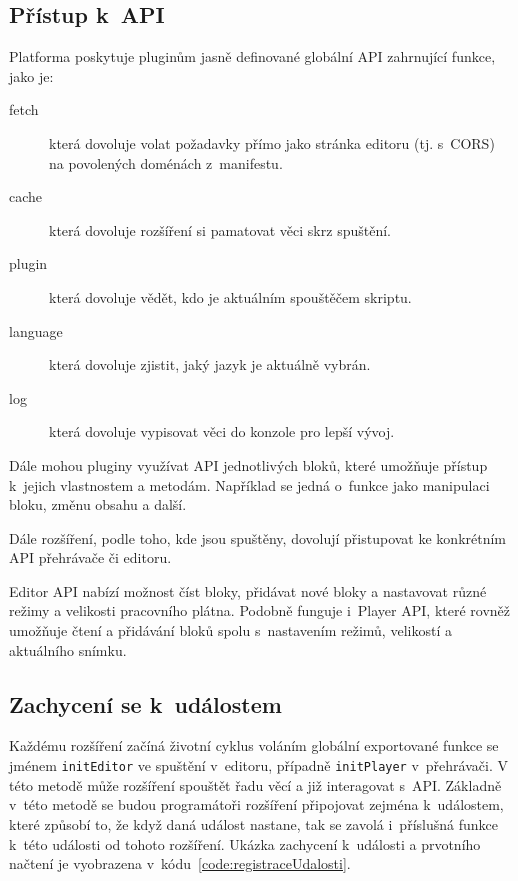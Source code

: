 \subsection{Přístup k~API}

Platforma poskytuje pluginům jasně definované globální API zahrnující funkce, jako je:

\begin{description}
    \item[fetch] která dovoluje volat požadavky přímo jako stránka editoru (tj. s~CORS) na povolených doménách z~manifestu.
    \item[cache] která dovoluje rozšíření si pamatovat věci skrz spuštění.
    \item[plugin] která dovoluje vědět, kdo je aktuálním spouštěčem skriptu.
    \item[language] která dovoluje zjistit, jaký jazyk je aktuálně vybrán.
    \item[log] která dovoluje vypisovat věci do konzole pro lepší vývoj.
\end{description}

Dále mohou pluginy využívat API jednotlivých bloků, které umožňuje přístup k~jejich vlastnostem a metodám.
Například se jedná o~funkce jako manipulaci bloku, změnu obsahu a další.

Dále rozšíření, podle toho, kde jsou spuštěny, dovolují přistupovat ke konkrétním API přehrávače či editoru.

Editor API nabízí možnost číst bloky, přidávat nové bloky a nastavovat různé režimy a velikosti pracovního plátna. 
Podobně funguje i~Player API, které rovněž umožňuje čtení a přidávání bloků spolu s~nastavením režimů, velikostí a aktuálního snímku.

\subsection{Zachycení se k~událostem}

Každému rozšíření začíná životní cyklus voláním globální exportované funkce se jménem \texttt{initEditor} ve spuštění v~editoru, případně \texttt{initPlayer} v~přehrávači.
V této metodě může rozšíření spouštět řadu věcí a již interagovat s~API.
Základně v~této metodě se budou programátoři rozšíření připojovat zejména k~událostem, které způsobí to, že když daná událost nastane, tak se zavolá i~příslušná funkce k~této události od tohoto rozšíření. 
Ukázka zachycení k~události a prvotního načtení je vyobrazena v~kódu~\ref{code:registraceUdalosti}.

